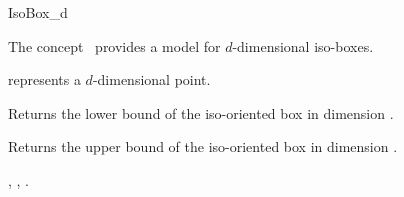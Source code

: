 

\begin{ccRefConcept}{IsoBox_d}


\ccDefinition
  
The concept \ccRefName\ provides a model for $d$-dimensional iso-boxes.

\ccParameters

 represents a $d$-dimensional point.

\ccTypes


\ccCreation
{}  %


\ccOperations

{Returns the lower bound of the iso-oriented box in dimension .
}

{Returns the upper bound of the iso-oriented box in dimension .}


\ccHasModels

, , 
.

\ccSeeAlso


\end{ccRefConcept}


